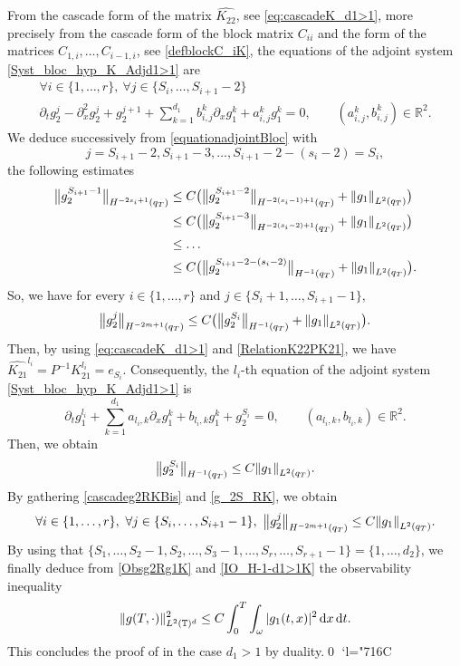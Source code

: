 \documentclass[JEP,XML,SOM,Unicode,NoEqCountersInSection]{cedram}
\newcommand{\Changelback}{\mathcode`l="716C}
\theoremstyle{plain}
\theoremstyle{definition}
\theoremstyle{remark}
\newcommand{\norme}[1]{\left\lVert#1\right\rVert}
\newcommand{\bnorme}[1]{\bigl\lVert#1\bigr\rVert}
\newcommand{\diff}[1][-3]{\ensuremath{\mathop{}\mkern#1mu\mathrm{d}}}
\newcommand{\set}{\mathbb}
\newcommand{\R}{} %
\renewcommand{\R}{\set{R}}
\newcommand{\T}{\set{T}}
\let\originalleft\left
\let\originalright\right
\renewcommand{\left}{\mathopen{}\mathclose\bgroup\originalleft}
\renewcommand{\right}{\aftergroup\egroup\originalright}
\begin{document}
From the cascade form of the matrix $\widehat{K_{22}}$, see \eqref{eq:cascadeK_d1>1}, more precisely from the cascade form of the block matrix $C_{ii}$ and the form of the matrices $C_{1,i}, \dots, C_{i-1,i}$, see \eqref{defblockC_iK}, the equations of the adjoint system \eqref{Syst_bloc_hyp_K_Adjd1>1} are
\begin{multline}
\label{equationadjointBloc}
\forall i \in \{1, \dots, r\},\ \forall j \in \{S_i, \dots, S_{i+1}-2\}\\
\partial_t g_2^{j} - \partial_x^2 g_2^{j} + g_2^{j+1} + \sum_{k=1}^{d_1} b_{i,j}^k \partial_x g_1^k + a_{i,j}^k g_1^k =0,\qquad (a_{i,j}^k,b_{i,j}^k) \in \R^2.
\end{multline}
We deduce successively from \eqref{equationadjointBloc} with
\[
j=S_{i+1}-2, S_{i+1}-3, \dots, S_{i+1}-2-(s_{i}-2) = S_i,
\]
the following estimates
\begin{align*}
\bnorme{g_2^{S_{i+1}-1}}_{H^{-2s_i+1}(q_T)} & \leq C \bigl(\bnorme{g_2^{S_{i+1}-2}}_{H^{-2(s_i-1)+1}(q_T)} + \norme{g_1}_{L^2(q_T)}\bigr)\notag\\
& \leq C \bigl(\bnorme{g_2^{S_{i+1}-3}}_{H^{-2(s_i-2)+1}(q_T)} + \norme{g_1}_{L^2(q_T)}\bigr) \notag\\
& \leq \dots\label{cascadeg2RK}\\
& \leq C \bigl(\bnorme{g_2^{S_{i+1} -2 -(s_i-2)}}_{H^{-1}(q_T)} + \norme{g_1}_{L^2(q_T)}\bigr). \notag
\end{align*}
So, we have for every $i \in \{1, \dots, r\}$ and $j \in \{S_i+1, \dots, S_{i+1}-1\}$,
\begin{equation}
\label{cascadeg2RKBis}
\bnorme{g_2^{j}}_{H^{-2m+1}(q_T)} \leq C\bigl(\bnorme{g_2^{S_i}}_{H^{-1}(q_T)} + \norme{g_1}_{L^2(q_T)}\bigr).
\end{equation}
Then, by using \eqref{eq:cascadeK_d1>1} and \eqref{RelationK22PK21}, we have $\widehat{K_{21}}^{l_i}=P^{-1} K_{21}^{l_i} = e_{S_i}$. Consequently, the $l_i$-th equation of the adjoint system \eqref{Syst_bloc_hyp_K_Adjd1>1} is
\begin{equation*}
\partial_t g_1^{l_i} + \sum_{k=1}^{d_1} a_{l_i,k} \partial_x g_1^{k} + b_{l_i,k} g_1^{k} + g_2^{S_i} = 0,\qquad (a_{l_i,k}, b_{l_i,k}) \in \R^2.
\end{equation*}
Then, we obtain
\begin{equation}
\label{g_2S_RK}
\bnorme{g_2^{S_i}}_{H^{-1}(q_T)} \leq C \norme{g_1}_{L^2(q_T)}.
\end{equation}
By gathering \eqref{cascadeg2RKBis} and \eqref{g_2S_RK}, we obtain
\begin{equation}
\label{Obsg2Rg1K}
\forall i \in \{1, \dots, r\},\ \forall j \in \{S_i, \dots, S_{i+1}-1\},\ \bnorme{g_2^{j}}_{H^{-2m+1}(q_T)} \leq C \norme{g_1}_{L^2(q_T)}.
\end{equation}
By using that $\{S_1, \dots, S_{2}-1, S_2, \dots, S_{3}-1, \dots, S_{r}, \dots, S_{r+1}-1\} = \{1, \dots, d_2\}$, we finally deduce from \eqref{Obsg2Rg1K} and \eqref{IO_H-1-d1>1K}
the observability inequality\[
\| g(T,\cdot) \|_{L^2(\T)^{d}}^2 \leq C \int_0^T \int_{\omega} |g_1(t,x)|^2 \diff x \diff t.
\]
This concludes the proof of  in the case $d_1>1$ by duality.\qed
\Changelback
\end{document}
